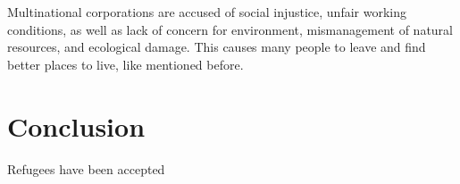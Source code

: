 Multinational corporations are accused of social injustice, unfair working conditions, as well as lack of concern for environment, mismanagement of natural resources, and ecological damage. This causes many people to leave and find better places to live, like mentioned before.

\section{Conclusion}
Refugees have been accepted


